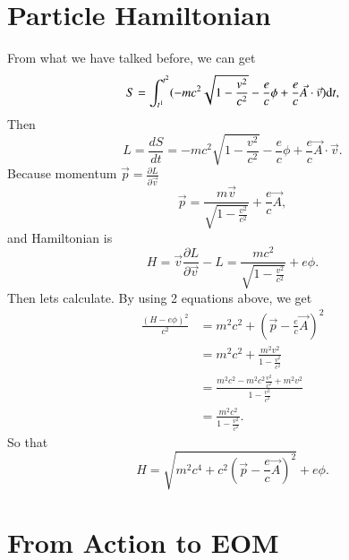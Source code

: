 \documentclass[openany,10pt]{book}
\theoremstyle{definition}
\theoremstyle{definition}
\theoremstyle{remark}
\begin{document}
\section{Particle Hamiltonian}
From what we have talked before, we can get
\begin{equation}
S=\int^{t^2}_{t^1}(-mc^2\sqrt{1-\frac{v^2}{c^2}}-\frac{e}{c}\phi+\frac{e}{c}\vec{A}\cdot\vec{v}){\rm{d}}t,
\end{equation}
Then
\begin{equation}
     L=\frac{dS}{dt}=-mc^2\sqrt{1-\frac{v^2}{c^2}}-\frac{e}{c}\phi+\frac{e}{c}\vec{A}\cdot\vec{v}.
\end{equation}
Because momentum $\vec{p}=\frac{\partial L}{\partial\vec{v}}$
\begin{equation}\label{momentum}
\vec{p}=\frac{m\vec{v}}{\sqrt{1-\frac{v^2}{c^2}}}+\frac{e}{c}\vec{A},
\end{equation}
and Hamiltonian is
\begin{equation}
H=\vec{v}\frac{\partial L}{\partial \vec{v}}-L=\frac{mc^2}{\sqrt{1-\frac{v^2}{c^2}}}+e\phi .
\end{equation}
Then lets calculate. By using 2 equations above, we get
\begin{equation}
\begin{aligned}
\frac{(H-e\phi)^2}{c^2}&=m^2c^2+(\vec{p}-\frac{e}{c}\vec{A})^2\\
&=m^2c^2+\frac{m^2v^2}{1-\frac{v^2}{c^2}}\\
&=\frac{m^2c^2-m^2c^2\frac{v^2}{c^2}+m^2v^2}{1-\frac{v^2}{c^2}}\\
&=\frac{m^2c^2}{1-\frac{v^2}{c^2}}.
\end{aligned}
\end{equation}
So that
\begin{equation}
H=\sqrt{m^2c^4+c^2(\vec{p}-\frac{e}{c}\vec{A})^2}+e\phi .
\end{equation}


\section{From Action to EOM}
\end{document}

